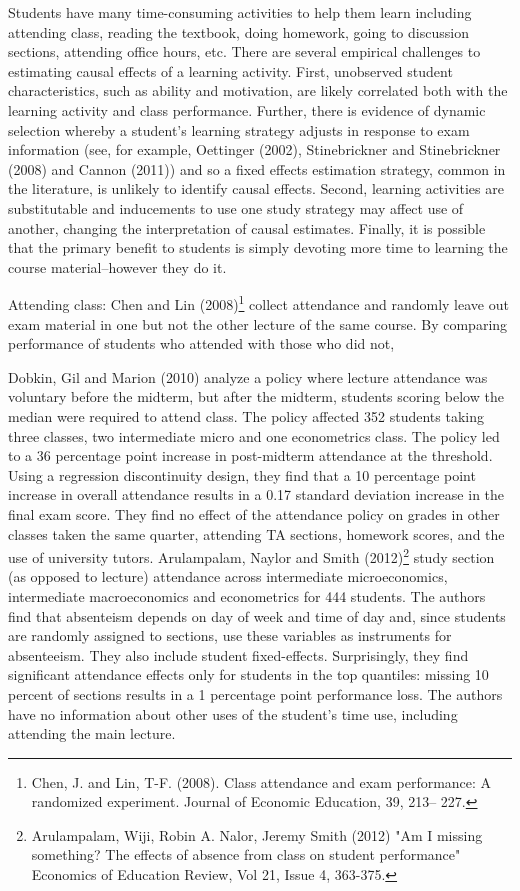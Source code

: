 \documentclass[12pt]{article}
\begin{document}
Students have many time-consuming activities to help them learn including attending class, reading the textbook, doing homework, going to discussion sections, attending office hours, etc. There are several empirical challenges to estimating causal effects of a learning activity.  First, unobserved student characteristics, such as ability and motivation, are likely correlated both with the learning activity and class performance.  Further, there is evidence of dynamic selection whereby a student's learning strategy adjusts in response to exam information (see, for example, Oettinger (2002), Stinebrickner and Stinebrickner (2008) and Cannon (2011)) and so a fixed effects estimation strategy, common in the literature, is unlikely to identify causal effects. Second, learning activities are substitutable and inducements to use one study strategy may affect use of another, changing the interpretation of causal estimates. Finally, it is possible that the primary benefit to students is simply devoting more time to learning the course material--however they do it.   

Attending class:  Chen and Lin (2008)\footnote{Chen, J. and Lin, T-F. (2008). Class attendance and exam performance: A randomized experiment. Journal of Economic Education, 39, 213– 227.} collect attendance and randomly leave out exam material in one but not the other lecture of the same course.  By comparing performance of students who attended with those who did not, 

Dobkin, Gil and Marion (2010) analyze a policy where lecture attendance was voluntary before the midterm, but after the midterm, students scoring below the median were required to attend class. The policy affected 352 students taking three classes, two intermediate micro and one econometrics class.  The policy led to a 36 percentage point increase in post-midterm attendance at the threshold.  Using a regression discontinuity design, they find that a 10 percentage point increase in overall attendance results in a 0.17 standard deviation increase in the final exam score.  They find no effect of the attendance policy on grades in other classes taken the same quarter, attending TA sections, homework scores, and the use of university tutors. 
Arulampalam, Naylor and Smith (2012)\footnote{Arulampalam, Wiji, Robin A. Nalor, Jeremy Smith (2012) "Am I missing something? The effects of absence from class on student performance" Economics of Education Review, Vol 21, Issue 4, 363-375.} study section (as opposed to lecture) attendance across intermediate microeconomics, intermediate macroeconomics and econometrics for 444 students.  The authors find that absenteism depends on day of week and time of day and, since students are randomly assigned to sections, use these variables as instruments for absenteeism.  They also include student fixed-effects.  Surprisingly, they find significant attendance effects only for students in the top quantiles: missing 10 percent of sections results in a 1 percentage point performance loss.  The authors have no information about other uses of the student's time use, including attending the main lecture.
\end{document}

